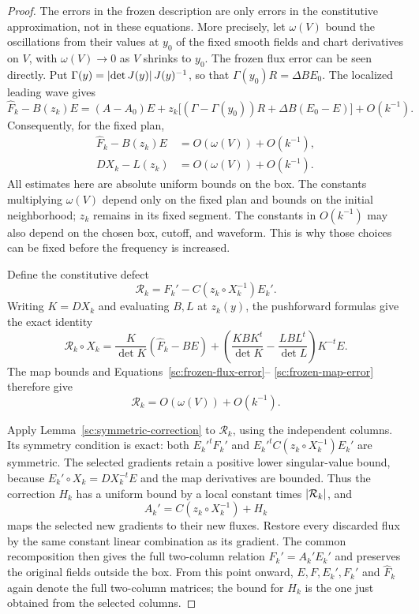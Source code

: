 \begin{proof}
The errors in the frozen description are only errors in the
constitutive approximation, not in these equations. More precisely,
let $\omega(V)$ bound the oscillations from their values at $y_0$ of
the fixed smooth fields and chart derivatives on $V$, with
$\omega(V)\to0$ as $V$ shrinks to $y_0$. The frozen flux error can
be seen directly. Put $\Gamma(y)=\left\lvert \det J(y)\right\rvert J(y)^{-1}$, so that
$\Gamma(y_0)R=\Delta B E_0$. The localized leading wave gives
\[
 \widehat F_k-B(z_k)E
 =(A-A_0)E+z_k\bigl[(\Gamma-\Gamma(y_0))R
                  +\Delta B(E_0-E)\bigr]+O(k^{-1}).
\]
Consequently, for the fixed plan,
\begin{align}
 \widehat F_k-B(z_k)E&=O(\omega(V))+O(k^{-1}),
       \label{sc:frozen-flux-error}\\
 DX_k-L(z_k)&=O(\omega(V))+O(k^{-1}).
       \label{sc:frozen-map-error}
\end{align}
All estimates here are absolute uniform bounds on the box. The
constants multiplying $\omega(V)$ depend only on the fixed plan and
bounds on the initial neighborhood; $z_k$ remains in its fixed segment.
The constants in $O(k^{-1})$ may also depend on the chosen box, cutoff,
and waveform. This is why those choices can be fixed before the frequency
is increased.

Define the constitutive defect
\[
 \mathcal R_k=F_k'-C(z_k\circ X_k^{-1})E_k'.
\]
Writing $K=DX_k$ and evaluating $B,L$ at $z_k(y)$, the pushforward
formulas give the exact identity
\[
 \mathcal R_k\circ X_k
 =\frac K{\det K}(\widehat F_k-BE)
 +\left(\frac{KBK^t}{\det K}-\frac{LBL^t}{\det L}\right)K^{-t}E.
\]
The map bounds and Equations~\eqref{sc:frozen-flux-error}--
\eqref{sc:frozen-map-error} therefore give
\begin{equation}
 \label{sc:constitutive-error}
 \mathcal R_k=O(\omega(V))+O(k^{-1}).
\end{equation}

Apply Lemma~\ref{sc:symmetric-correction} to $\mathcal R_k$, using
the independent columns. Its symmetry condition is exact: both
$E_k'^tF_k'$ and $E_k'^tC(z_k\circ X_k^{-1})E_k'$ are symmetric.
The selected gradients retain a positive lower singular-value bound,
because $E_k'\circ X_k=DX_k^{-t}E$ and the map derivatives are bounded.
Thus the correction $H_k$ has a uniform bound by a local constant
times $\left\lvert \mathcal R_k\right\rvert$, and
\[
 A_k'=C(z_k\circ X_k^{-1})+H_k
\]
maps the selected new gradients to their new fluxes. Restore every
discarded flux by the same constant linear combination as its gradient.
The common recomposition then gives the full two-column relation
$F_k'=A_k'E_k'$ and preserves the original fields outside the box.
From this point onward, $E,F,E_k',F_k'$ and $\widehat F_k$ again denote
the full two-column matrices; the bound for $H_k$ is the one just obtained
from the selected columns.


\end{proof}
